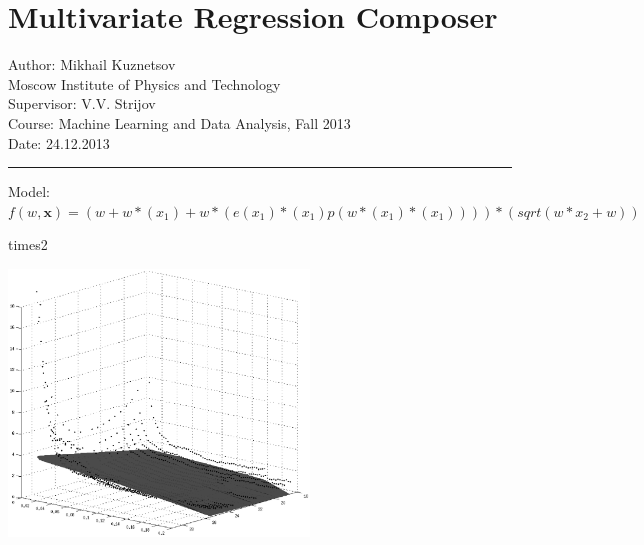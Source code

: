 \documentclass[12pt]{article}
\begin{document}
\section*{Multivariate Regression Composer}
Author: Mikhail Kuznetsov\\
Moscow Institute of Physics and Technology\\
Supervisor: V.V. Strijov\\
Course: Machine Learning and Data Analysis, Fall 2013\\
Date: 24.12.2013\\
\hrule
\vspace{1cm}
Model: $f(w,\mathbf{x})=(w+w*(x_1)+w*(e(x_1)*(x_1)p(w*(x_1)*(x_1))))*(sqrt(w*x_2+w))$

\begin{multicols}{2}
\begin{bundle}{times2}\end{bundle}

\columnbreak
\includegraphics[width=8cm]{1.eps}
\end{multicols}
\end{document}

